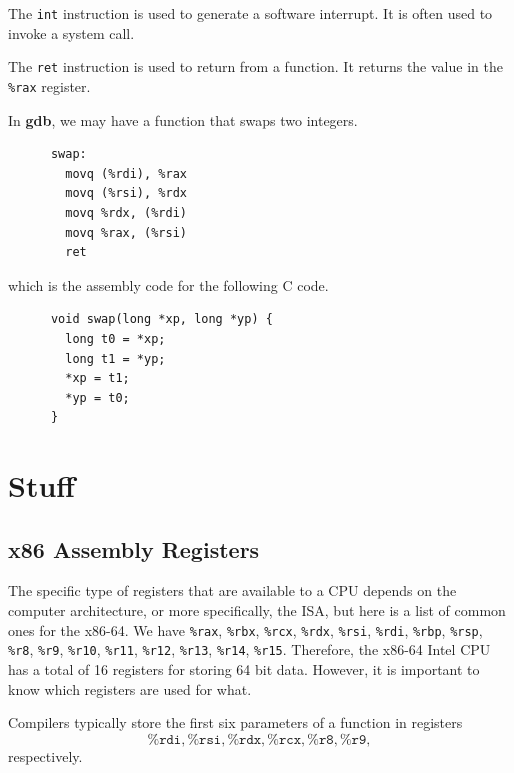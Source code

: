 \documentclass{article}
\begin{document}
  \begin{definition}[int]
    The \texttt{int} instruction is used to generate a software interrupt. It is often used to invoke a system call.
  \end{definition}

  \begin{definition}[ret]
    The \texttt{ret} instruction is used to return from a function. It returns the value in the \texttt{\%rax} register. 
  \end{definition}

  \begin{example}
    In \textbf{gdb}, we may have a function that swaps two integers. 
    \begin{lstlisting} 
      swap:
        movq (%rdi), %rax
        movq (%rsi), %rdx
        movq %rdx, (%rdi)
        movq %rax, (%rsi)
        ret
    \end{lstlisting}
  which is the assembly code for the following C code.
    \begin{lstlisting} 
      void swap(long *xp, long *yp) {
        long t0 = *xp;
        long t1 = *yp;
        *xp = t1;
        *yp = t0;
      }
    \end{lstlisting}
  \end{example}

\section{Stuff}

\subsection{x86 Assembly Registers}

  The specific type of registers that are available to a CPU depends on the computer architecture, or more specifically, the ISA, but here is a list of common ones for the x86-64. We have \texttt{\%rax}, \texttt{\%rbx}, \texttt{\%rcx}, \texttt{\%rdx}, \texttt{\%rsi}, \texttt{\%rdi}, \texttt{\%rbp}, \texttt{\%rsp}, \texttt{\%r8}, \texttt{\%r9}, \texttt{\%r10}, \texttt{\%r11}, \texttt{\%r12}, \texttt{\%r13}, \texttt{\%r14}, \texttt{\%r15}. Therefore, the x86-64 Intel CPU has a total of 16 registers for storing 64 bit data. However, it is important to know which registers are used for what. 

  \begin{definition}
    Compilers typically store the first six parameters of a function in registers 
    \begin{equation}
      \texttt{\%rdi}, \texttt{\%rsi}, \texttt{\%rdx}, \texttt{\%rcx}, \texttt{\%r8}, \texttt{\%r9}, 
    \end{equation}
    respectively. 
  \end{definition}
\end{document}
